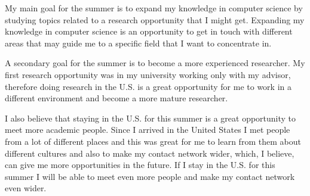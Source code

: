 \documentclass[11pt, a4paper]{awesome-cv}
\begin{document}
\begin{cvletter}
\par My main goal for the summer is to expand my knowledge in computer science by studying topics related to a research opportunity that I might get. Expanding my knowledge in computer science is an opportunity to get in touch with different areas that may guide me to a specific field that I want to concentrate in.

\par A secondary goal for the summer is to become a more experienced researcher. My first research opportunity was in my university working only with my advisor, therefore doing research in the U.S. is a great opportunity for me to work in a different environment and become a more mature researcher.

\par I also believe that staying in the U.S. for this summer is a great opportunity to meet more academic people. Since I arrived in the United States I met people from a lot of different places and this was great for me to learn from them about different cultures and also to make my contact network wider, which, I believe, can give me more opportunities in the future. If I stay in the U.S. for this summer I will be able to meet even more people and make my contact network even wider.

\end{cvletter}


\end{document}
